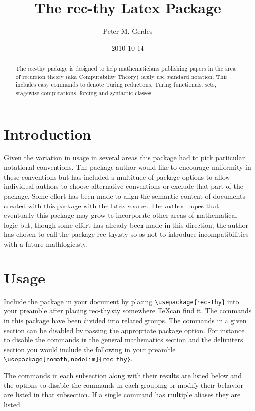 \documentclass[11pt,oneside]{amsart}
\title{The rec-thy Latex Package}
\author{Peter M. Gerdes}
\date{2010-10-14}
\begin{document}
\maketitle


\begin{abstract}
	The rec-thy package is designed to help mathematicians publishing papers in the area of recursion theory (aka Computability Theory) easily use standard notation.  This includes easy commands to denote Turing reductions, Turing functionals, \ce sets, stagewise computations, forcing and syntactic classes.
\end{abstract}

\section{Introduction}
Given the variation in usage in several areas this package had to pick particular notational conventions.  The package author would like to encourage uniformity in these conventions but has included a multitude of package options to allow individual authors to choose alternative conventions or exclude that part of the package.  Some effort has been made to align the semantic content of documents created with this package with the latex source.  The author hopes that eventually this package may grow to incorporate other areas of mathematical logic but, though some effort has already been made in this direction, the author has chosen to call the package rec-thy.sty so as not to introduce incompatibilities with a future mathlogic.sty.

\section{Usage}
Include the package in your document by placing \verb=\usepackage{rec-thy}= into your preamble after placing rec-thy.sty somewhere \TeX can find it.  The commands in this package have been divided into related groups.  The commands in a given section can be disabled by passing the appropriate package option.  For instance to disable the commands in the general mathematics section and the delimiters section you would include the following in your preamble \verb=\usepackage[nomath,nodelim]{rec-thy}=.  

The commands in each subsection along with their results are listed below and the options to disable the commands in each grouping or modify their behavior are listed in that subsection.  If a single command has multiple aliases they are listed 
\end{document}
